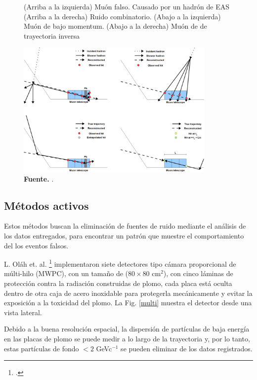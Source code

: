 \begin{figure}[H]
    \begin{center}
        \caption{(Arriba a la izquierda) Muón falso. Causado por un hadrón de EAS (Arriba a la derecha) Ruido combinatorio. (Abajo a la izquierda) Muón de bajo momentum. (Abajo a la derecha) Muón de de trayectoria inversa }
        \includegraphics[width=0.86\textwidth]{Figures/imagenes/noise.jpg}
        \caption*{\textbf{Fuente.} \cite{bonechi2020atmospheric}. }
        \label{ruido}
    \end{center}
\end{figure}


\subsection{Métodos activos}

Estos métodos buscan la eliminación de fuentes de ruido mediante el análisis de los datos entregados, para encontrar un patrón que muestre el comportamiento del los eventos falsos.

L. Oláh et. al. \footcite{olah2018high} implementaron siete detectores tipo cámara proporcional de múlti-hilo (MWPC), con un tamaño de ($ 80 \times 80$ cm$^{2}$), con cinco láminas de protección contra la radiación construidas de plomo, cada placa está oculta dentro de otra caja de acero inoxidable para protegerla mecánicamente y evitar la exposición a la toxicidad del plomo. La Fig. \ref{multi} muestra el detector desde una vista lateral.

 Debido a la buena resolución espacial, la dispersión de partículas de baja energía en las placas de plomo se puede medir a lo largo de la trayectoria y, por lo tanto, estas partículas de fondo $< 2$ GeVc$^{-1}$ se pueden eliminar de los datos registrados. 
 
